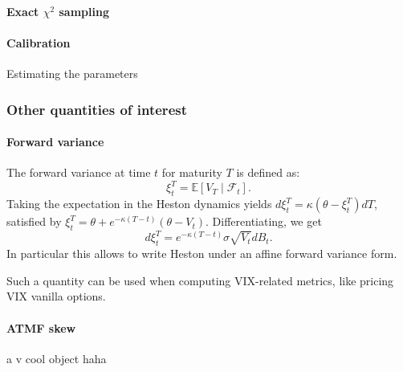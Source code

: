 \paragraph{Exact $\chi^2$ sampling}

\paragraph{Calibration} Estimating the parameters

\subsubsection*{Other quantities of interest}

\paragraph{Forward variance}

The forward variance at time $t$ for maturity $T$ is defined as:
\[ \xi_t^T = \mathbb{E}\left[V_T \mid \mathcal{F}_t \right]. \]
Taking the expectation in the Heston dynamics yields $d \xi_t^T = \kappa (\theta - \xi_t^T) dT$, satisfied by $\xi_t^T = \theta + e^{-\kappa (T-t)} (\theta - V_t)$.
\newline Differentiating, we get \[d \xi_t^T = e^{-\kappa (T-t)} \sigma \sqrt{V_t} dB_t.\] In particular this allows to write Heston under an affine forward variance form.

Such a quantity can be used when computing VIX-related metrics, like pricing VIX vanilla options.

\paragraph{ATMF skew}

a v cool object haha